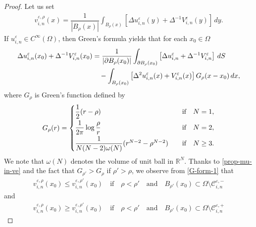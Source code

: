 \documentclass[12pt]{amsart}
\begin{document}
\begin{proof}
Let us set 
\begin{align*}
v^{{\varepsilon},\rho}_{i,n}(x) 
= \dfrac{1}{| B_{\rho}(x) |} \int_{B_{\rho}(x)} \left[ \Delta u^{\varepsilon}_{i,n}(y) + \Delta^{-1} V^{\varepsilon}_{i,n}(y)\right] \, dy.  
\end{align*}
If $u^{\varepsilon}_{i,n} \in C^{\infty}(\Omega)$, then Green's formula yields that for each $x_{0} \in \Omega$ 
\begin{align}\label{G-form-1}
\Delta u^{\varepsilon}_{i,n}(x_{0}) + \Delta^{-1} V^{\varepsilon}_{i,n}(x_{0}) 
&= \dfrac{1}{| {\partial} B_{\rho}(x_{0}) |} \int_{{\partial} B_{\rho}(x_{0})} \left[ \Delta u^{\varepsilon}_{i,n} + \Delta^{-1} V^{\varepsilon}_{i,n}\right] \, dS \\
& \quad - \int_{B_{\rho}(x_{0})} \left[ \Delta^{2} u^{\varepsilon}_{i,n}(x) + V^{\varepsilon}_{i,n}(x) \right] G_{\rho}(x-x_{0}) \, dx, \notag
\end{align}
where $G_{\rho}$ is Green's function defined by 
\begin{align} \label{G-func}
G_{\rho}(r)= 
\begin{cases}
\vspace{0.1cm}
\dfrac{1}{2} (r-\rho) & \text{if} \quad N=1, \\
\vspace{0.1cm}
\dfrac{1}{2 \pi} \log{\dfrac{\rho}{r}} & \text{if} \quad N=2, \\
\dfrac{1}{N(N-2) \omega(N)} (r^{N-2} - \rho^{N-2}) \quad & \text{if} \quad N \ge 3. \\
\end{cases}
\end{align}
We note that $\omega(N)$ denotes the volume of unit ball in ${\mathbb{R}}^{N}$. 
Thanks to \eqref{prop-mu-in-ve} and the fact that $G_{\rho'} > G_{\rho}$ if $\rho' > \rho$, we observe from \eqref{G-form-1} that 
\begin{align} \label{v-mono-dec}
v^{{\varepsilon},\rho}_{i,n}(x_{0}) \le v^{{\varepsilon},\rho'}_{i,n}(x_{0}) 
\quad \text{if} \quad \rho < \rho' \quad \text{and} \quad B_{\rho'}(x_{0}) \subset \Omega \setminus {\mathcal{C}}^{{\varepsilon},-}_{i,n} 
\end{align}
and 
\begin{align} \label{v-mono-inc}
v^{{\varepsilon},\rho}_{i,n}(x_{0}) \ge v^{{\varepsilon},\rho'}_{i,n}(x_{0}) 
\quad \text{if} \quad \rho < \rho' \quad \text{and} \quad B_{\rho'}(x_{0}) \subset \Omega \setminus {\mathcal{C}}^{{\varepsilon},+}_{i,n} 
\end{align}

\end{proof}
\end{document}
